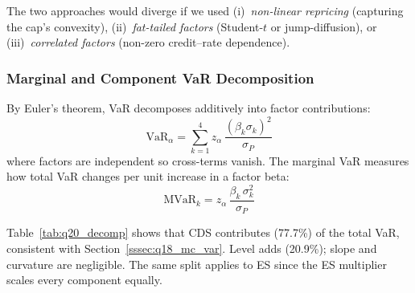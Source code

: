 \documentclass[11pt,a4paper]{article}
\begin{document}
The two approaches would diverge if we used
(i)~\emph{non-linear repricing} (capturing the cap's convexity),
(ii)~\emph{fat-tailed factors} (Student-$t$ or jump-diffusion), or
(iii)~\emph{correlated factors} (non-zero credit--rate dependence).

\subsubsection{Marginal and Component VaR Decomposition}
\label{sssec:q20_decomp}

By Euler's theorem, VaR decomposes additively into factor
contributions:
\begin{equation}
  \mathrm{VaR}_\alpha
  = \sum_{k=1}^{4}
  z_\alpha \,\frac{(\beta_k \sigma_k)^2}{\sigma_P}
\end{equation}
where factors are independent so cross-terms vanish.
The marginal VaR measures how total VaR changes per unit
increase in a factor beta:
\begin{equation}
  \mathrm{MVaR}_k
  = z_\alpha \,\frac{\beta_k\,\sigma_k^2}{\sigma_P}
\end{equation}

Table~\ref{tab:q20_decomp} shows that CDS contributes
 (77.7\%) of the  total VaR,
consistent with Section~\ref{sssec:q18_mc_var}.
Level adds  (20.9\%); slope and curvature are
negligible.  The same split applies to ES since the ES
multiplier scales every component equally.
\end{document}

